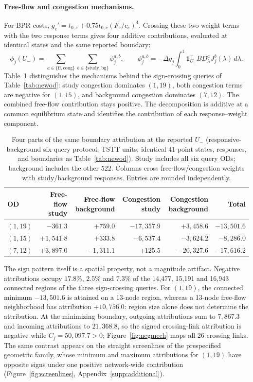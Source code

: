 \paragraph{Free-flow and congestion mechanisms.}\label{subsec:newod}
For BPR costs, $g_e'=t_{0,e}+0.75t_{0,e}(F_e/c_e)^4$. Crossing these two weight terms with the two response terms gives four additive contributions, evaluated at identical states and the same reported boundary:
\[
\phi_j(U_-)=\sum_{a\in\{\mathrm{ff,cong}\}}\sum_{b\in\{\mathrm{study,bg}\}}\phi_j^{a,b},
\qquad \phi_j^{a,b}=-\Delta q_j\int_0^1\mathbf1_{U_-}^{\top}BD_\lambda^aJ_j^b(\lambda)\,d\lambda.
\]
Table~\ref{tab:ffcong} distinguishes the mechanisms behind the sign-crossing queries of Table~\ref{tab:newod}: study congestion dominates $(1,19)$, both congestion terms are negative for $(1,15)$, and background congestion dominates $(7,12)$. The combined free-flow contribution stays positive. The decomposition is additive at a common equilibrium state and identifies the contribution of each response--weight component.
\begin{table}[pos=htbp]
\caption{Four parts of the same boundary attribution at the reported
$U_-$ (responsive-background six-query protocol; TSTT units; identical $41$-point
states, responses, and boundaries as Table~\ref{tab:newod}). Study
includes all six query ODs; background includes the other $522$.
Columns cross free-flow/congestion weights with study/background
responses. Entries are rounded independently.}\label{tab:ffcong}
\small
\begin{tabular*}{\tblwidth}{@{\extracolsep{\fill}}lrrrrr}
\toprule
OD & Free-flow study & Free-flow background & Congestion study & Congestion background & Total\\
\midrule
$(1,19)$ & $-361.3$ & $+759.0$ & $-17{,}357.9$ & $+3{,}458.6$ & $-13{,}501.6$ \\
$(1,15)$ & $+1{,}541.8$ & $+333.8$ & $-6{,}537.4$ & $-3{,}624.2$ & $-8{,}286.0$ \\
$(7,12)$ & $+3{,}897.0$ & $-1{,}311.1$ & $+125.5$ & $-20{,}327.6$ & $-17{,}616.2$ \\
\bottomrule
\end{tabular*}
\end{table}
The sign pattern itself is a spatial property, not a magnitude artifact. Negative attributions occupy $17.8\%$, $2.5\%$ and $7.3\%$ of the 14,477, 15,191 and 16,943 connected regions of the three sign-crossing queries. For $(1,19)$, the connected minimum $-13{,}501.6$ is attained on a 13-node region, whereas a 13-node free-flow neighborhood has attribution $+10{,}756.0$: region size alone does not determine the attribution. At the minimizing boundary, outgoing attributions sum to $7{,}867.3$ and incoming attributions to $21{,}368.8$, so the signed crossing-link attribution is negative while $C_j=50{,}097.7>0$; Figure~\ref{fig:negmech} maps all 26 crossing links. The same contrast appears on the straight screenlines of the prespecified geometric family, whose minimum and maximum attributions for $(1,19)$ have opposite signs under one positive network-wide contribution (Figure~\ref{fig:screenlines}, Appendix~\ref{supp:additional}).
